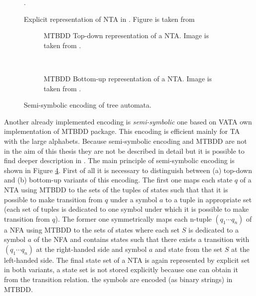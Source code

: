 \begin{figure}[bt]
\begin{center}

	\caption{Explicit representation of NTA in \vata. Figure is taken from \cite{libvata}}.
	\label{fig:explnta}
\end{center}
\end{figure}

\begingroup
{}%
\begin{figure}[bt]
	\centering
	\begin{subfigure}{.5\textwidth}
		\centering
		
		\caption{MTBDD Top-down representation of a NTA. Image is taken from \cite{libvata}.}
		\label{fig:mtbdd_td}
	\end{subfigure}%
	~
	\begin{subfigure}{.5\textwidth}
	\centering
	
	\caption{MTBDD Bottom-up representation of a NTA. Image is taken from \cite{libvata}.}
	\label{fig:mtbdd_bu}
	\end{subfigure}%
\caption{Semi-symbolic encoding of tree automata.}
\label{fig:symnta}
\end{figure}
\endgroup

Another already implemented encoding is \emph{semi-symbolic} one based on VATA own implementation of MTBDD package.
This encoding is efficient mainly for TA with the large alphabets.
Because semi-symbolic encoding and MTBDD are not in the aim of this thesis they are not be described in detail
but it is possible to find deeper description in \cite{mt:lengal}.
The main principle of semi-symbolic encoding is shown in Figure \ref{fig:symnta}.
First of all it is necessary to distinguish between (a) top-down and (b) bottom-up variants of this encoding.
The first one maps each state $q$ of a NTA using MTBDD to the sets of the tuples of states such that that it is possible
to make transition from $q$ under a symbol $a$ to a tuple in appropriate set (each set of tuples is dedicated
to one symbol under which it is possible to make transition from $q$).
The former one symmetrically maps each n-tuple $(q_1 \cdots q_n)$ of a NFA using MTBDD to the sets of states
where each set $S$ is dedicated to a symbol $a$ of the NFA and contains states such that there exists a transition
with $(q_1 \cdots q_n)$ at the right-handed side and symbol $a$ and state from the set $S$ at the left-handed side.
The final state set of a NTA is again represented by explicit set in both variants,
a state set is not stored explicitly because one can obtain it from the transition relation.
the symbols are encoded (as binary strings) in MTBDD.

